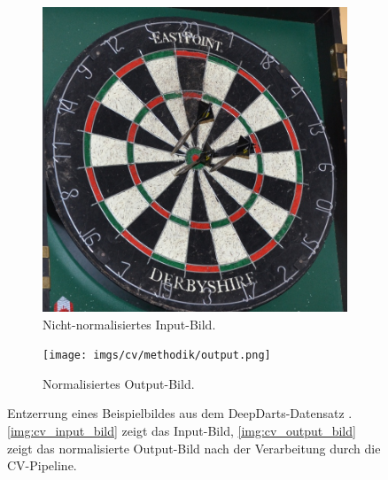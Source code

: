 \begin{figure}
    \centering
    \begin{subfigure}{0.45\textwidth}
        \centering
        \includegraphics[width=\textwidth]{imgs/cv/methodik/input.jpg}
        \caption{Nicht-normalisiertes Input-Bild.}
        \label{img:cv_input_bild}
    \end{subfigure}
    \hfill
    \begin{subfigure}{0.45\textwidth}
        \centering\texttt{[image: imgs/cv/methodik/output.png]}
        \caption{Normalisiertes Output-Bild.}
        \label{img:cv_output_bild}
    \end{subfigure}
    \caption{Entzerrung eines Beispielbildes aus dem DeepDarts-Datensatz \cite{deepdarts-data}. \autoref{img:cv_input_bild} zeigt das Input-Bild, \autoref{img:cv_output_bild} zeigt das normalisierte Output-Bild nach der Verarbeitung durch die CV-Pipeline.}
    \label{img:cv_input_ouptut}
\end{figure}
